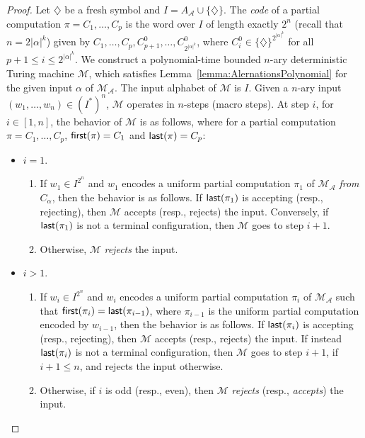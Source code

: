 \begin{proof}
Let $\diamondsuit$ be a fresh symbol and $I=A_{\mathcal{A}}\cup\{\diamondsuit\}$. The \emph{code} of a partial computation $\pi=C_1,\ldots,C_p$ is the word over $I$ of length exactly $2^{n}$ (recall that $n=2|\alpha|^{k}$) given by $C_1,\ldots,C_p,C_{p+1}^{0},\ldots,C_{2^{|\alpha|^{k}}}^{0}$, where $C_i^{0}\in \{\diamondsuit\}^{2^{|\alpha|^{k}}}$ for all $p+1\leq i\leq 2^{|\alpha|^{k}}$. We construct a polynomial-time bounded $n$-ary deterministic Turing machine $\mathcal{M}$, which satisfies Lemma~\ref{lemma:AlernationsPolynomial} for the given input $\alpha$ of $\mathcal{M}_{\mathcal{A}}$. The input alphabet of $\mathcal{M}$ is $I$.
Given a  $n$-ary input $(w_1,\ldots,w_n)\in (I^{*})^{n}$, $\mathcal{M}$ operates in $n$-steps (macro steps). At step $i$, for $i\in [1,n]$, the behavior of $\mathcal{M}$ is as follows, where for a partial computation $\pi=C_1,\ldots,C_p$,  $\text{{\sffamily first}}(\pi)=C_1$ and $\text{{\sffamily last}}(\pi)=C_p$:
\begin{itemize}
  \item $i=1$.
  \begin{enumerate}
    \item  If $w_1\in I^{2^{n}}$ and $w_1$ encodes a uniform partial computation $\pi_1$ of $\mathcal{M}_{\mathcal{A}}$ \emph{from $C_\alpha$}, then the behavior is as follows. If $\text{{\sffamily last}}(\pi_1)$ is accepting (resp., rejecting), then $\mathcal{M}$ accepts (resp., rejects) the input. Conversely, if $\text{{\sffamily last}}(\pi_1)$ is not a terminal configuration, then $\mathcal{M}$ goes to step $i+1$.
        \item Otherwise, $\mathcal{M}$ \emph{rejects} the input.
  \end{enumerate}
  \item $i>1$.
  \begin{enumerate}
    \item  If $w_i\in I^{2^{n}}$ and $w_i$ encodes a uniform partial computation $\pi_i$ of $\mathcal{M}_{\mathcal{A}}$ such that $\text{{\sffamily first}}(\pi_i)=\text{{\sffamily last}}(\pi_{i-1})$, where $\pi_{i-1}$ is the uniform partial computation encoded by $w_{i-1}$, then the behavior is as follows. If $\text{{\sffamily last}}(\pi_i)$ is accepting (resp., rejecting), then $\mathcal{M}$ accepts (resp., rejects) the input. If instead $\text{{\sffamily last}}(\pi_i)$ is not a terminal configuration, then $\mathcal{M}$ goes to step $i+1$, if $i+1\leq n$, and rejects the input otherwise.
    \item Otherwise, if $i$ is odd (resp., even), then $\mathcal{M}$ \emph{rejects} (resp., \emph{accepts}) the input.
  \end{enumerate}
\end{itemize}


\end{proof}
